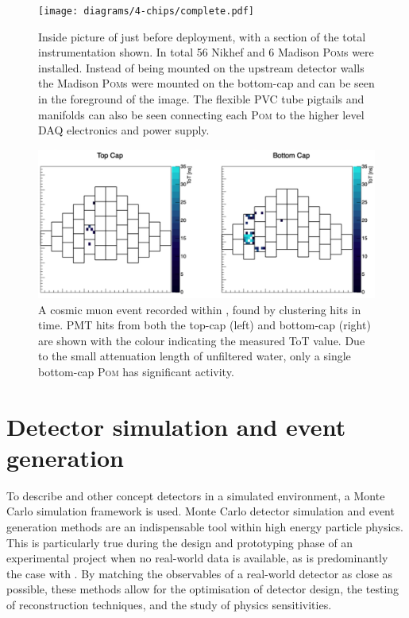 \begin{figure} %
    \texttt{[image: diagrams/4-chips/complete.pdf]}
    \caption[Inside picture of \chipsfive just before deployment]
    {Inside picture of \chipsfive just before deployment, with a section of the total
        instrumentation shown. In total 56 Nikhef and 6 Madison \textsc{Pom}s were installed.
        Instead of being mounted on the upstream detector walls the Madison \textsc{Pom}s were
        mounted on the bottom-cap and can be seen in the foreground of the image. The flexible PVC
        tube pigtails and manifolds can also be seen connecting each \textsc{Pom} to the higher
        level DAQ electronics and power supply.}
    \label{fig:complete}
\end{figure}

\begin{figure} %
    \includegraphics[width=\textwidth]{diagrams/4-chips/cosmic_event.pdf}
    \caption[A cosmic muon event recorded within \chipsfive]
    {A cosmic muon event recorded within \chipsfive, found by clustering hits in time. PMT hits
    from both the top-cap (left) and bottom-cap (right) are shown with the colour indicating the
    measured ToT value. Due to the small attenuation length of unfiltered water, only a single
    bottom-cap \textsc{Pom} has significant activity.}
    \label{fig:cosmic_event}
\end{figure}

\section{Detector simulation and event generation} %
\label{sec:chips_monte_carlo} %


To describe \chipsfive and other \chips concept detectors in a simulated environment, a Monte
Carlo simulation framework is used. Monte Carlo detector simulation and event generation methods
are an indispensable tool within high energy particle physics. This is particularly true during
the design and prototyping phase of an experimental project when no real-world data is available,
as is predominantly the case with \chips. By matching the observables of a real-world detector as
close as possible, these methods allow for the optimisation of detector design, the testing of
reconstruction techniques, and the study of physics sensitivities.

